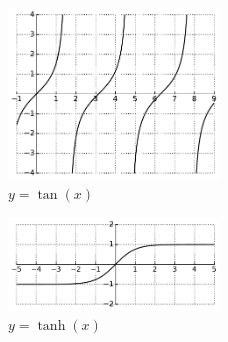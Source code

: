 \begin{figure}[h!]
\includegraphics[width=0.5\textwidth]{img/tan.pdf}
\caption{$y=\tan(x)$}
\end{figure}

\begin{figure}[h!]
\includegraphics[width=0.5\textwidth]{img/tanh.pdf}
\caption{$y=\tanh(x)$}
\end{figure}



